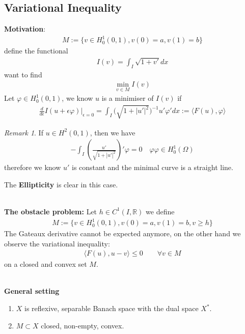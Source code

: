 \documentclass[a4paper,11pt,oneside,fleqn]{book}
\theoremstyle{definition}
\theoremstyle{remark}
\newtheorem*{remark}{Remark}
\begin{document}
\subsection{Variational Inequality}
\textbf{Motivation}:
\begin{align*}
	M:= \{v \in H^1_0(0, 1), v(0) = a, v(1) = b \}
\end{align*}
define the functional 
\begin{align*}
	I(v) = \int_I \sqrt{1 + v'} dx 
\end{align*}
want to find
\begin{align*}
	\min_{ v \in M} I(v) 
\end{align*}
Let $\varphi \in H^1_0(0, 1)$, we know $u$ is a minimiser of $I(v)$ if 
\begin{align*}
	\frac{d}{d\epsilon} I(u + \epsilon \varphi)|_{ \epsilon = 0}   = \int_I \bigg(\sqrt{1 + |u'|^2} \bigg)^{-1} u' \varphi' dx := \langle F(u), \varphi \rangle  
\end{align*}

\begin{remark}
If $u \in H^2(0, 1)$, then we have
\begin{align*}
	-\int_I (\frac{u'}{\sqrt{1 + |u'|^2}})' \varphi = 0 \quad \varphi \varphi \in H_0^1(\Omega)
\end{align*}
therefore we know $u'$ is constant and the minimal curve is a straight line. 	
\end{remark}
The \textbf{Ellipticity} is clear in this case.  

\quad\\
\textbf{The obstacle problem:} Let $h \in C^1(I, \mathbb{R})$ we define
\begin{align*}
	M:= \{v \in H^1_0(0, 1), v(0) = a, v(1) = b, v \ge h \}
\end{align*}
The Gateaux derivative cannot be expected anymore, on the other hand we observe the variational inequality:
\begin{align*}
	\langle F(u), u - v \rangle  \le 0 \qquad \forall v \in M 
\end{align*}
on a closed and convex set $M$. 



\quad\\
\textbf{General setting}
\begin{enumerate}
	\item $X$ is reflexive, separable Banach space with the dual space $X^*$. 
	\item $M \subset X$ closed, non-empty, convex. 
\end{enumerate}
\end{document}
